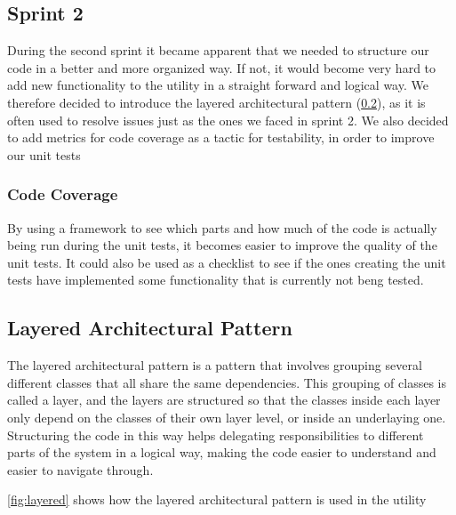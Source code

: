 \subsection{Sprint 2}
During the second sprint it became apparent that we needed to structure our code in a better and more organized way. If not, it would become very hard to add new functionality to the \gls{utility} in a straight forward and logical way. We therefore decided to introduce the layered architectural pattern (\ref{sec:Layered}), as it is often used to resolve issues just as the ones we faced in sprint 2. We also decided to add metrics for code coverage as a tactic for testability, in order to improve our unit tests

\subsubsection{Code Coverage}
By using a framework to see which parts and how much of the code is actually being run during the unit tests, it becomes easier to improve the quality of the unit tests. It could also be used as a checklist to see if the ones creating the unit tests have implemented some functionality that is currently not beng tested.


\subsection{Layered Architectural Pattern}
\label{sec:Layered}
The layered architectural pattern is a pattern that involves grouping several different classes that all share the same dependencies. This grouping of classes is called a layer, and the layers are structured so that the classes inside each layer only depend on the classes of their own layer level, or inside an underlaying one. Structuring the code in this way helps delegating responsibilities to different parts of the system in a logical way, making the code easier to understand and easier to navigate through.

\autoref{fig:layered} shows how the layered architectural pattern is used in the \gls{utility}

